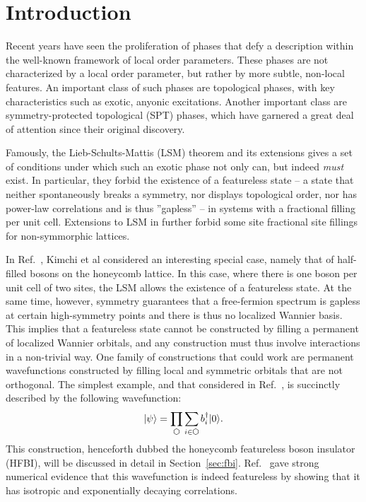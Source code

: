
\section{Introduction}

Recent years have seen the proliferation of phases that defy a description
within the well-known framework of local order parameters. These phases are
not characterized by a local order parameter, but rather by more subtle,
non-local features. An important class of such phases are topological phases,
with key characteristics such as exotic, anyonic excitations. Another
important class are symmetry-protected topological (SPT) phases, which have
garnered a great deal of attention since their original discovery.

Famously, the Lieb-Schults-Mattis (LSM) theorem and its extensions gives a set of
conditions under which such an exotic phase not only can, but indeed \emph{must}
exist. In particular, they forbid the existence of a featureless state
-- a state that neither spontaneously breaks a symmetry, nor displays topological
order, nor has power-law correlations and is thus ''gapless'' -- in systems
with a fractional filling per unit cell. Extensions to LSM in  further
forbid some site fractional site fillings for non-symmorphic lattices.

In Ref.~, Kimchi et al considered an interesting special case, namely that of half-filled bosons on the honeycomb lattice.
In this case, where there is one boson per unit cell of two sites, the LSM allows the existence of a featureless state.
At the same time, however, symmetry guarantees that
a free-fermion spectrum is gapless at certain high-symmetry points and there is
thus no localized Wannier basis.
This implies that a featureless state cannot be constructed by filling a permanent of localized Wannier orbitals, and any construction must thus involve interactions in a non-trivial way. One family of constructions that could work are permanent wavefunctions constructed by filling local and symmetric orbitals that are not orthogonal. The simplest example, and that considered in Ref.~, is succinctly described by the following wavefunction:
\begin{equation}
\ket{\psi} = \prod\limits_{\varhexagon} \sum\limits_{i \in
\varhexagon} b^{\dagger}_{i} \ket{0}.
\end{equation}
This construction,
henceforth dubbed the honeycomb featureless boson insulator (HFBI),
will be discussed in detail in Section~\ref{sec:fbi}. Ref.~ gave strong numerical evidence that this wavefunction is indeed featureless by showing that it has isotropic and exponentially decaying correlations.

